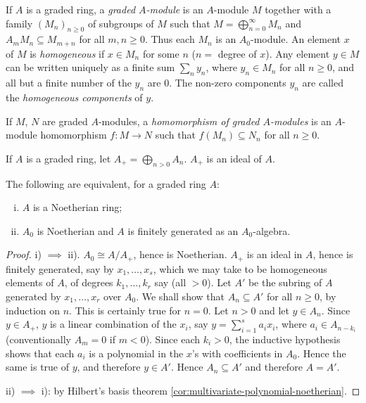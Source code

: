 If $A$ is a graded ring, a \emph{graded $A$-module} is an $A$-module $M$ together with a family $(M_n)_{n \geq 0}$ of subgroups of $M$ such that $M = \bigoplus_{n=0}^\infty M_n$ and $A_m M_n \subseteq M_{m+n}$ for all $m, n \geq 0$. Thus each $M_n$ is an $A_0$-module. An element $x$ of $M$ is \emph{homogeneous} if $x \in M_n$ for some $n$ ($n = $ degree of $x$). Any element $y \in M$ can be written uniquely as a finite sum $\sum_n y_n$, where $y_n \in M_n$ for all $n \geq 0$, and all but a finite number of the $y_n$ are $0$. The non-zero components $y_n$ are called the \emph{homogeneous components} of $y$.

If $M$, $N$ are graded $A$-modules, a \emph{homomorphism of graded $A$-modules} is an $A$-module homomorphism $f \colon M \to N$ such that $f(M_n) \subseteq N_n$ for all $n \geq 0$.

If $A$ is a graded ring, let $A_+ = \bigoplus_{n > 0} A_n$. $A_+$ is an ideal of $A$.

\begin{proposition}\label{prop:graded-noetherian}
The following are equivalent, for a graded ring $A$:
\begin{enumerate}[i)]
    \item $A$ is a Noetherian ring;
    \item $A_0$ is Noetherian and $A$ is finitely generated as an $A_0$-algebra.
\end{enumerate}
\end{proposition}

\begin{proof}
i) $\implies$ ii). $A_0 \cong A/A_+$, hence is Noetherian. $A_+$ is an ideal in $A$, hence is finitely generated, say by $x_1, \ldots, x_s$, which we may take to be homogeneous elements of $A$, of degrees $k_1, \ldots, k_r$ say (all $> 0$). Let $A'$ be the subring of $A$ generated by $x_1, \ldots, x_r$ over $A_0$. We shall show that $A_n \subseteq A'$ for all $n \geq 0$, by induction on $n$. This is certainly true for $n = 0$. Let $n > 0$ and let $y \in A_n$. Since $y \in A_+$, $y$ is a linear combination of the $x_i$, say $y = \sum_{i=1}^s a_i x_i$, where $a_i \in A_{n-k_i}$ (conventionally $A_m = 0$ if $m < 0$). Since each $k_i > 0$, the inductive hypothesis shows that each $a_i$ is a polynomial in the $x$'s with coefficients in $A_0$. Hence the same is true of $y$, and therefore $y \in A'$. Hence $A_n \subseteq A'$ and therefore $A = A'$.

ii) $\implies$ i): by Hilbert's basis theorem \eqref{cor:multivariate-polynomial-noetherian}.
\end{proof}

